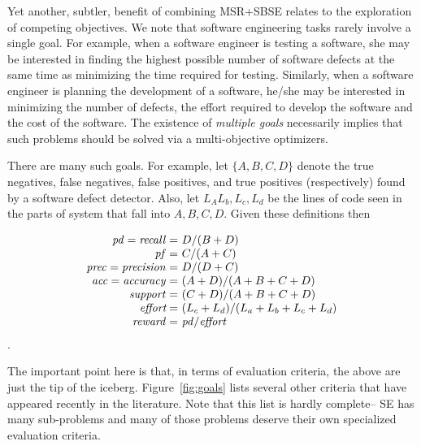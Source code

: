 \documentclass[sigconf,anonymous,review]{acmart}
\begin{document}
 Yet another, subtler, benefit of combining MSR+SBSE relates to the exploration of competing
 objectives.
 We note that  
 software engineering tasks rarely involve a
single goal. For example, when a software engineer
is testing a software, she may be interested in
finding the highest possible number of software
defects at the same time as minimizing the time
required for testing. Similarly, when a software
engineer is planning the development of a software,
he/she may be interested in minimizing the number of
defects, the effort required to develop the software
and the cost of the software. The existence of {\em
multiple goals} necessarily implies that such problems should be solved via
a   multi-objective optimizers.

There are many such goals. For example, 
let $\{A,B,C,D\}$ denote the
true negatives,
false negatives,
false positives, and
true positives
(respectively) found by a software defect detector.
Also, let $L_A L_b, L_c, L_d$ be the lines of code
seen in the parts of system that fall
into $A,B,C,D$. Given these definitions then


{\small\[
\begin{array}{r@{~}l}
\mathit{pd}=\mathit{recall}=&D / (B+D)\\
\mathit{pf}=&C / (A+C)\\
\mathit{prec}=\mathit{precision}=&D / (D+C)\\
\mathit{acc}=\mathit{accuracy}=&(A+D) / (A+B+C+D)\\
\mathit{support}=&(C+D) / (A+B+C+D)\\
\textit{effort}=&(L_c+L_d) / (L_a + L_b + L_c + L_d)\\
\mathit{reward}=&\mathit{pd} / \textit{effort}
\end{array}
\]}.






The important point here is that, in terms of evaluation criteria,  the above are just the tip of the iceberg.
Figure~\ref{fig:goals} lists several other criteria that have appeared recently in the literature. Note that this list is hardly complete-- SE has many sub-problems and many of those
problems deserve their own specialized evaluation criteria.
\end{document}
